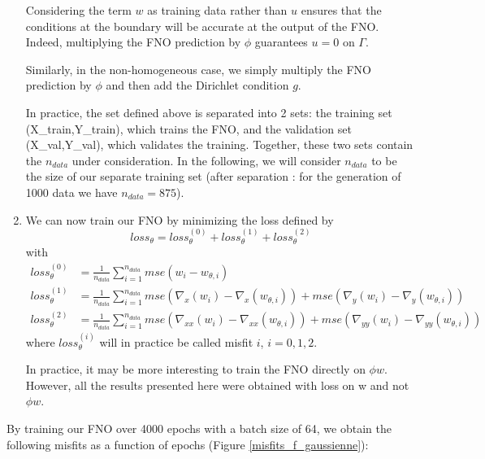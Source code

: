 \begin{enumerate}[label=\textbullet]
	\begin{Rem}
		Considering the term $w$ as training data rather than $u$ ensures that the conditions at the boundary will be accurate at the output of the FNO. Indeed, multiplying the FNO prediction by $\phi$ guarantees $u=0$ on $\Gamma$. 
		
		Similarly, in the non-homogeneous case, we simply multiply the FNO prediction by $\phi$ and then add the Dirichlet condition $g$.
	\end{Rem}
	
	\begin{Rem}
		In practice, the set defined above is separated into 2 sets: the training set (X\_train,Y\_train), which trains the FNO, and the validation set (X\_val,Y\_val), which validates the training. Together, these two sets contain the $n_{data}$ under consideration. In the following, we will consider $n_{data}$ to be the size of our separate training set (after separation : for the generation of 1000 data we have $n_{data}=875$). 
	\end{Rem}
	\item We can now train our FNO by minimizing the loss defined by
	\begin{equation*}
		loss_\theta = loss_\theta^{(0)} + loss_\theta^{(1)} + loss_\theta^{(2)}
	\end{equation*}
	with 
	\begin{align*}
		loss_\theta^{(0)} &= \frac{1}{n_{data}}\sum_{i=1}^{n_{data}} mse(w_i-w_{\theta,i}) \\
		loss_\theta^{(1)} &= \frac{1}{n_{data}}\sum_{i=1}^{n_{data}} mse(\nabla_x(w_i)-\nabla_x(w_{\theta,i}))+mse(\nabla_y(w_i)-\nabla_y(w_{\theta,i})) \\
		loss_\theta^{(2)} &= \frac{1}{n_{data}}\sum_{i=1}^{n_{data}} mse(\nabla_{xx}(w_i)-\nabla_{xx}(w_{\theta,i})) + mse(\nabla_{yy}(w_i)-\nabla_{yy}(w_{\theta,i}))
	\end{align*}
	where $loss_\theta^{(i)}$ will in practice be called misfit $i$, $i=0,1,2$.
	\begin{Rem}
		In practice, it may be more interesting to train the FNO directly on $\phi w$. However, all the results presented here were obtained with loss on w and not $\phi w$.
	\end{Rem}
\end{enumerate}

\newpage

By training our FNO over 4000 epochs with a batch size of 64, we obtain the following misfits as a function of epochs (Figure \ref{misfits_f_gaussienne}):

